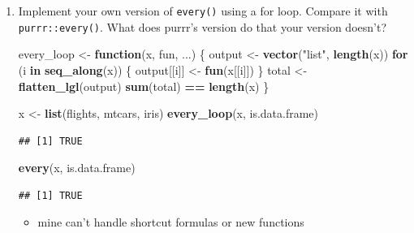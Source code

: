 \documentclass[]{book}
\newenvironment{Shaded}{\begin{snugshade}}{\end{snugshade}}
\newcommand{\ControlFlowTok}[1]{\textcolor[rgb]{0.13,0.29,0.53}{\textbf{#1}}}
\newcommand{\DecValTok}[1]{\textcolor[rgb]{0.00,0.00,0.81}{#1}}
\newcommand{\KeywordTok}[1]{\textcolor[rgb]{0.13,0.29,0.53}{\textbf{#1}}}
\newcommand{\NormalTok}[1]{#1}
\newcommand{\OperatorTok}[1]{\textcolor[rgb]{0.81,0.36,0.00}{\textbf{#1}}}
\newcommand{\StringTok}[1]{\textcolor[rgb]{0.31,0.60,0.02}{#1}}
\providecommand{\tightlist}{%
  \setlength{\itemsep}{0pt}\setlength{\parskip}{0pt}}
\theoremstyle{definition}
\theoremstyle{definition}
\theoremstyle{definition}
\theoremstyle{remark}
\begin{document}
\begin{enumerate}
\def\labelenumi{\arabic{enumi}.}
\item
  Implement your own version of \texttt{every()} using a for loop.
  Compare it with \texttt{purrr::every()}. What does purrr's version do
  that your version doesn't?

\begin{Shaded}
\begin{Highlighting}[]
\NormalTok{every_loop <-}\StringTok{ }\ControlFlowTok{function}\NormalTok{(x, fun, ...) \{}
\NormalTok{  output <-}\StringTok{ }\KeywordTok{vector}\NormalTok{(}\StringTok{"list"}\NormalTok{, }\KeywordTok{length}\NormalTok{(x))}
  \ControlFlowTok{for}\NormalTok{ (i }\ControlFlowTok{in} \KeywordTok{seq_along}\NormalTok{(x)) \{}
\NormalTok{  output[[i]] <-}\StringTok{ }\KeywordTok{fun}\NormalTok{(x[[i]])}
\NormalTok{  \}}
\NormalTok{  total <-}\StringTok{ }\KeywordTok{flatten_lgl}\NormalTok{(output)}
  \KeywordTok{sum}\NormalTok{(total) }\OperatorTok{==}\StringTok{ }\KeywordTok{length}\NormalTok{(x)}
\NormalTok{\}}

\NormalTok{x <-}\StringTok{ }\KeywordTok{list}\NormalTok{(flights, mtcars, iris)}
\KeywordTok{every_loop}\NormalTok{(x, is.data.frame)}
\end{Highlighting}
\end{Shaded}

\begin{verbatim}
## [1] TRUE
\end{verbatim}

\begin{Shaded}
\begin{Highlighting}[]
\KeywordTok{every}\NormalTok{(x, is.data.frame)}
\end{Highlighting}
\end{Shaded}

\begin{verbatim}
## [1] TRUE
\end{verbatim}

  \begin{itemize}
  \tightlist
  \item
    mine can't handle shortcut formulas or new functions
  \end{itemize}

\begin{Shaded}
\end{Shaded}


\end{enumerate}
\end{document}
